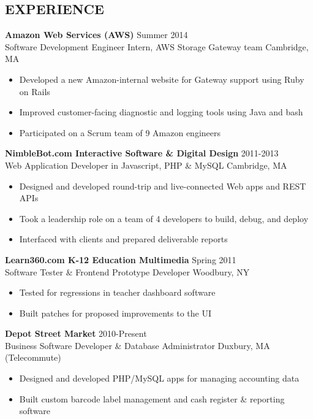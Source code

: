 \documentclass[line,margin]{res}
\begin{document}
\begin{resume}
\section{EXPERIENCE}
	{\large \textbf{Amazon Web Services (AWS)}}
    \hfill Summer 2014 \\
    Software Development Engineer Intern, AWS Storage Gateway team
    \hfill Cambridge, MA
    \begin{itemize}  \itemsep -2pt
        \item Developed a new Amazon-internal website for Gateway support using Ruby on Rails
        \item Improved customer-facing diagnostic and logging tools using Java and bash
        \item Participated on a Scrum team of 9 Amazon engineers
    \end{itemize}
    
    {\large \textbf{NimbleBot.com Interactive Software \& Digital Design}}
    \hfill 2011-2013 \\
    Web Application Developer in Javascript, PHP \& MySQL
    \hfill Cambridge, MA
    \begin{itemize}  \itemsep -2pt %
        \item Designed and developed round-trip and live-connected Web apps and REST APIs
        \item Took a leadership role on a team of 4 developers to build, debug, and deploy
        \item Interfaced with clients and prepared deliverable reports
    \end{itemize}

	{\large \textbf{Learn360.com K-12 Education Multimedia}}
    \hfill Spring 2011 \\
    Software Tester \& Frontend Prototype Developer
    \hfill Woodbury, NY
    \begin{itemize}  \itemsep -2pt %
        \item Tested for regressions in teacher dashboard software
        \item Built patches for proposed improvements to the UI
    \end{itemize}

    {\large \textbf{Depot Street Market}}
    \hfill 2010-Present \\
    Business Software Developer \& Database Administrator
    \hfill Duxbury, MA {\footnotesize (Telecommute)}
    \begin{itemize}  \itemsep -2pt %
        \item Designed and developed PHP/MySQL apps for managing accounting data
        \item Built custom barcode label management and cash register \& reporting software
    \end{itemize}


\end{resume}
\end{document}
